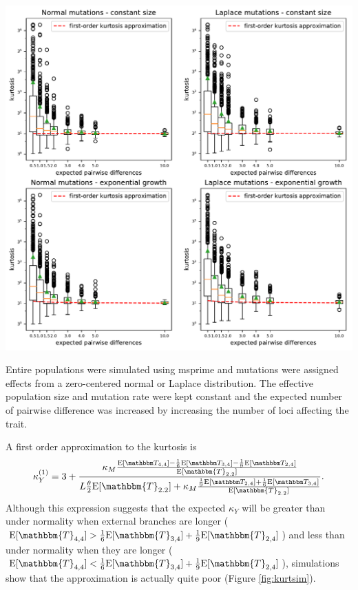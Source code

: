 \begin{center}
  \centering \includegraphics[width=\textwidth]{figures/kurt_sim.pdf}
  \label{fig:kurtsim}
\end{center}
Entire populations were simulated using msprime \citep{Kelleher2015} and
mutations were assigned effects from a zero-centered normal or Laplace
distribution. The effective population size and mutation rate were kept constant
and the expected number of pairwise difference was increased by increasing the
number of loci affecting the trait.

A first order approximation to the kurtosis is
\begin{equation}
    \label{eq:firstord} 
\kappa_Y^{(1)} = 3 + \frac{\kappa_M \frac{\CCC}{\E[\mathbbm{T}_{2.2}]}} {L \T \E[\mathbbm{T}_{2.2}]
    + \kappa_M \frac{\BBB}{\E[\mathbbm{T}_{2.2}]}}.
\end{equation}
Although this expression suggests that the expected $\kappa_Y$ will be greater
than under normality when external branches are longer ($\E[\mathbbm{T}_{4,4}] >
\frac{1}{6}\E[\mathbbm{T}_{3,4}] + \frac{1}{9}\E[\mathbbm{T}_{2,4}]$) and less
than under normality when they are longer ($\E[\mathbbm{T}_{4,4}] <
\frac{1}{6}\E[\mathbbm{T}_{3,4}] + \frac{1}{9}\E[\mathbbm{T}_{2,4}]$),
simulations show that the approximation is actually quite poor (Figure
\ref{fig:kurtsim}).
